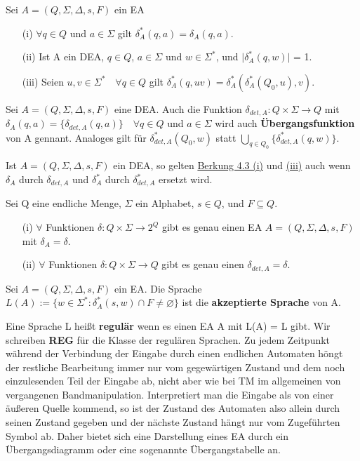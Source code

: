 Sei \(A = (Q, \Sigma, \Delta, s, F)\) ein EA
\begin{itemize}
    \item [(i)] \( \forall q \in Q\) und \(a\in \Sigma\) gilt \(\delta_{A}^{*}(q,a) = \delta_{A}(q, a)\).
    \item [(ii)] Ist A ein DEA, \(q \in Q\), \(a \in \Sigma\) und \(w \in \Sigma^{*}\), und \(\lvert \delta_{A}^{*}(q,w) \rvert\) = 1.
    \item[(iii)] Seien \(u,v \in \Sigma^{*} \quad \forall q \in Q\) gilt \(\delta_{A}^{*}(q, uv) = \delta_{A}^{*}(\delta_{A}^{*}(Q_{0}, u), v)\).
\end{itemize}

Sei \(A = (Q, \Sigma,  \Delta, s, F)\) eine DEA. Auch die Funktion \(\delta_{det, A}: Q \times \Sigma \rightarrow Q\) mit \(\delta_{A}(q,a) = \{\delta_{det, A}(q, a)\} \quad \forall q \in Q\) und \(a \in \Sigma\) wird auch \textbf{Übergangsfunktion} von A gennant. Analoges gilt für \(\delta_{det, A}^{*}(Q_{0}, w)\) statt \(\bigcup \limits_{q \in Q_{0}}\{\delta_{det, A}^{*}(q, w)\}\).

    Ist \(A = (Q, \Sigma, \Delta, s, F)\) ein DEA, so gelten \hyperref[subsec:4.3]{Berkung 4.3 (i)} und \hyperref[subsec:4.3]{(iii)} auch wenn \(\delta_{A}\) durch \(\delta_{det, A}\) und \(\delta_{A}^{*}\) durch \(\delta_{det, A}^{*}\) ersetzt wird.

    Sei Q eine endliche Menge, \(\Sigma\) ein Alphabet, \(s\in Q\), und \(F\subseteq Q\). 
    \begin{itemize}
        \item [(i)] \(\forall\) Funktionen \(\delta : Q \times \Sigma \rightarrow 2^{Q}\) gibt es genau einen EA \(A = (Q, \Sigma, \Delta, s, F)\) mit \(\delta_{A} = \delta\).
        \item [(ii)] \(\forall\) Funktionen \(\delta : Q \times \Sigma \rightarrow Q\) gibt es genau einen \(\delta_{det, A} = \delta\). 
    \end{itemize}

    Sei \(A = (Q, \Sigma, \Delta, s, F)\) ein EA. Die Sprache \(L(A) := \{w \in \Sigma^{*} : \delta_{A}^{*}(s, w)\cap F \neq \varnothing \}\) ist die \textbf{akzeptierte Sprache} von A.

    Eine Sprache L heißt \textbf{regulär} wenn es einen EA A mit L(A) = L gibt. Wir schreiben \textbf{REG} für die Klasse der regulären Sprachen. Zu jedem Zeitpunkt während der Verbindung der Eingabe durch einen endlichen Automaten höngt der restliche Bearbeitung immer nur vom gegewärtigen Zustand und dem noch einzulesenden Teil der Eingabe ab, nicht aber wie bei TM im allgemeinen von vergangenen Bandmanipulation. Interpretiert man die Eingabe als von einer äußeren Quelle kommend, so ist der  Zustand des Automaten also allein durch seinen Zustand gegeben und der nächste Zustand hängt nur vom Zugeführten Symbol ab. Daher bietet sich eine Darstellung eines EA durch ein Übergangsdiagramm oder eine sogenannte Übergangstabelle an.

